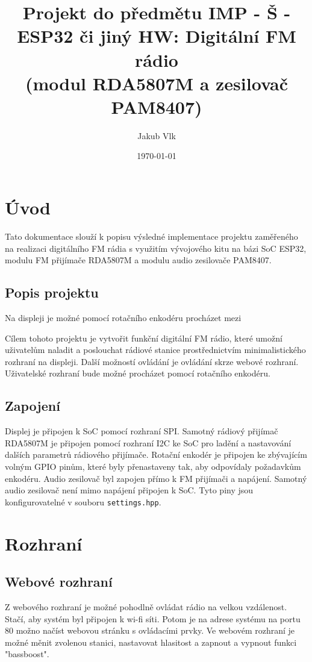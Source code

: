 \documentclass{article}
\title{Projekt do předmětu IMP - Š - ESP32 či jiný HW: Digitální FM rádio \\ (modul RDA5807M a zesilovač PAM8407)}
\author{Jakub Vlk}
\date{\today}
\begin{document}
	
	\maketitle
	\newpage
	
	\section{Úvod}
	Tato dokumentace slouží k popisu výsledné implementace projektu zaměřeného na realizaci digitálního FM rádia s využitím vývojového kitu na bázi SoC ESP32, modulu FM přijímače RDA5807M a modulu audio zesilovače PAM8407.
	
	\subsection{Popis projektu}
	
	Na displeji je možné pomocí rotačního enkodéru procházet mezi %
	
	Cílem tohoto projektu je vytvořit funkční digitální FM rádio, které umožní uživatelům naladit a poslouchat rádiové stanice prostřednictvím minimalistického rozhraní na displeji. Další možností ovládání je ovládání skrze webové rozhraní. Uživatelské rozhraní bude možné procházet pomocí rotačního enkodéru.
	
	\subsection{Zapojení}
	Displej je připojen k SoC pomocí rozhraní SPI. Samotný rádiový přijímač RDA5807M je připojen pomocí rozhraní I2C ke SoC pro ladění a nastavování dalších parametrů rádiového přijímače. Rotační enkodér je připojen ke zbývajícím volným GPIO pinům, které byly přenastaveny tak, aby odpovídaly požadavkům enkodéru. Audio zesilovač byl zapojen přímo k FM přijímači a napájení. Samotný audio zesilovač není mimo napájení připojen k SoC. Tyto piny jsou konfigurovatelné v souboru \texttt{settings.hpp}.
	
	
	\section{Rozhraní}
	\subsection{Webové rozhraní}
	Z webového rozhraní je možné pohodlně ovládat rádio na velkou vzdálenost. Stačí, aby systém byl připojen k wi-fi síti. Potom je na adrese systému na portu 80 možno načíst webovou stránku s ovládacími prvky. Ve webovém rozhraní je možné měnit zvolenou stanici, nastavovat hlasitost a zapnout a vypnout funkci "bassboost".
	
\end{document}
